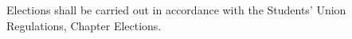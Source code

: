 \begin{clause}
Elections shall be carried out in accordance with the Students' Union Regulations, Chapter Elections.
\end{clause}